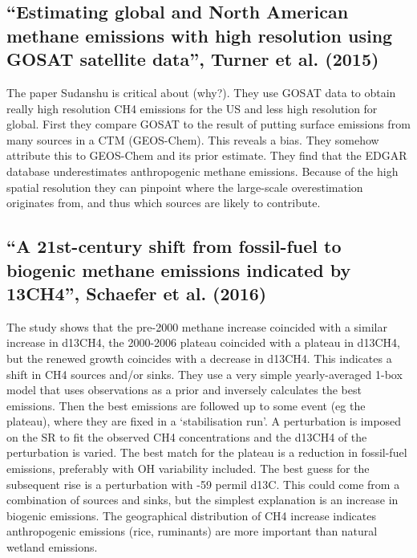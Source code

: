 {\subsection{“Estimating global and North American methane emissions with high resolution using GOSAT satellite data”, Turner et al. (2015)}
The paper Sudanshu is critical about (why?). They use GOSAT data to obtain really high resolution CH4 emissions for the US and less high resolution for global. First they compare GOSAT to the result of putting surface emissions from many sources in a CTM (GEOS-Chem). This reveals a bias. They somehow attribute this to GEOS-Chem and its prior estimate. They find that the EDGAR database underestimates anthropogenic methane emissions. Because of the high spatial resolution they can pinpoint where the large-scale overestimation originates from, and thus which sources are likely to contribute.

\subsection{“A 21st-century shift from fossil-fuel to biogenic methane emissions indicated by 13CH4”, Schaefer et al. (2016)}
The study shows that the pre-2000 methane increase coincided with a similar increase in d13CH4, the 2000-2006 plateau coincided with a plateau in d13CH4, but the renewed growth coincides with a decrease in d13CH4. This indicates a shift in CH4 sources and/or sinks. They use a very simple yearly-averaged 1-box model that uses observations as a prior and inversely calculates the best emissions. Then the best emissions are followed up to some event (eg the plateau), where they are fixed in a ‘stabilisation run’. A perturbation is imposed on the SR to fit the observed CH4 concentrations and the d13CH4 of the perturbation is varied.
The best match for the plateau is a reduction in fossil-fuel emissions, preferably with OH variability included. The best guess for the subsequent rise is a perturbation with -59 permil d13C. This could come from a combination of sources and sinks, but the simplest explanation is an increase in biogenic emissions. The geographical distribution of CH4 increase indicates anthropogenic emissions (rice, ruminants) are more important than natural wetland emissions.

}
